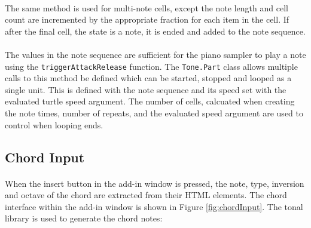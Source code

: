 \paragraph{} The same method is used for multi-note cells, except the note length and cell count are incremented by the appropriate fraction for each item in the cell. If after the final cell, the state is a note, it is ended and added to the note sequence.

\paragraph{} The values in the note sequence are sufficient for the piano sampler to play a note using the \texttt{triggerAttackRelease} function. The \texttt{Tone.Part} class allows multiple calls to this method be defined which can be started, stopped and looped as a single unit. This is defined with the note sequence and its speed set with the evaluated turtle speed argument. The number of cells, calcuated when creating the note times, number of repeats, and the evaluated speed argument are used to control when looping ends.



\subsection{Chord Input}

\paragraph{} When the insert button in the add-in window is pressed, the note, type, inversion and octave of the chord are extracted from their HTML elements. The chord interface within the add-in window is shown in Figure \ref{fig:chordInput}. The tonal library is used to generate the chord notes:

